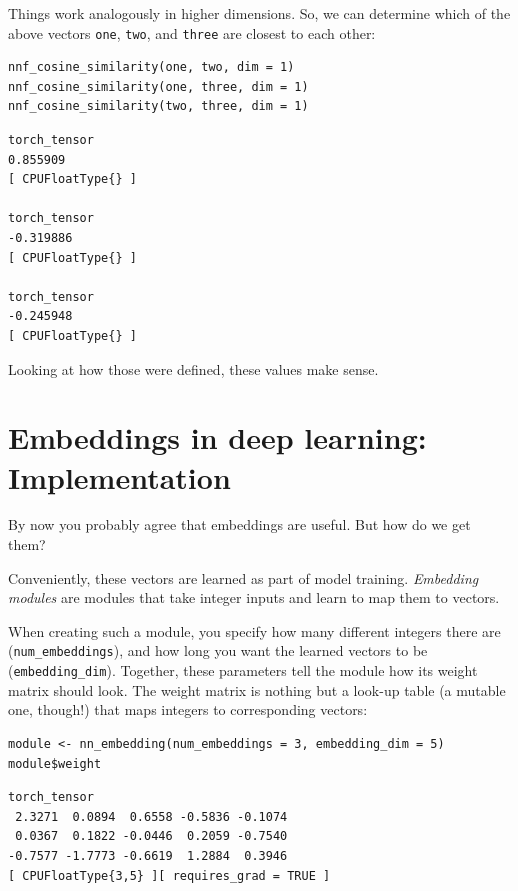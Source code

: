 \documentclass[
  letterpaper,
]{krantz}
\begin{document}
Things work analogously in higher dimensions. So, we can determine which
of the above vectors \texttt{one}, \texttt{two}, and \texttt{three} are
closest to each other:

\begin{verbatim}
nnf_cosine_similarity(one, two, dim = 1)
nnf_cosine_similarity(one, three, dim = 1)
nnf_cosine_similarity(two, three, dim = 1)
\end{verbatim}

\begin{verbatim}
torch_tensor
0.855909
[ CPUFloatType{} ]

torch_tensor
-0.319886
[ CPUFloatType{} ]

torch_tensor
-0.245948
[ CPUFloatType{} ]
\end{verbatim}

Looking at how those were defined, these values make sense.

\hypertarget{embeddings-in-deep-learning-implementation}{%
\section{Embeddings in deep learning:
Implementation}\label{embeddings-in-deep-learning-implementation}}

By now you probably agree that embeddings are useful. But how do we get
them?

Conveniently, these vectors are learned as part of model training.
\emph{Embedding modules} are modules that take integer inputs and learn
to map them to vectors.

When creating such a module, you specify how many different integers
there are (\texttt{num\_embeddings}), and how long you want the learned
vectors to be (\texttt{embedding\_dim}). Together, these parameters tell
the module how its weight matrix should look. The weight matrix is
nothing but a look-up table (a mutable one, though!) that maps integers
to corresponding vectors:

\begin{verbatim}
module <- nn_embedding(num_embeddings = 3, embedding_dim = 5)
module$weight
\end{verbatim}

\begin{verbatim}
torch_tensor
 2.3271  0.0894  0.6558 -0.5836 -0.1074
 0.0367  0.1822 -0.0446  0.2059 -0.7540
-0.7577 -1.7773 -0.6619  1.2884  0.3946
[ CPUFloatType{3,5} ][ requires_grad = TRUE ]
\end{verbatim}
\end{document}
